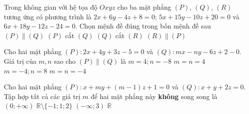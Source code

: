 \begin{ex}
	Trong không gian với hệ tọa độ $O x y z$ cho ba mặt phẳng $(P)$, $(Q)$, $(R)$ tương ứng có phương trình là $2 x+6 y-4 z+8=0$; $5 x+15 y-10 z+20=0$ và $6 x+18 y-12 z-24=0$. Chọn mệnh đề đúng trong bốn mệnh đề sau
	\choice
	{$(P) \parallel (Q)$}
	{$(P)$ cắt $(Q)$}
	{$(Q)$ cắt $(R)$}
	{\True $(R) \parallel (P)$}
\end{ex}
\begin{ex}%
	Cho hai mặt phẳng $(P) \colon 2x+4y+3z-5=0$ và $(Q) \colon mx-ny-6z+2-0$. Giá trị của $m,n$ sao cho $(P) \parallel (Q)$ là
	\choice
	{$m=4;n=-8$}
	{$m=n=4$}
	{\True $m=-4;n=8$}
	{$m=n=-4$}
	
\end{ex}

\begin{ex}
	Cho hai mặt phẳng $(P)\colon x+my+(m-1)z+1=0$ và $(Q)\colon x+y+2z=0$. Tập hợp tất cả các giá trị $m$ để hai mặt phẳng này \textbf{không} song song là
	\choice
	{$(0;+\infty)$}
	{$\mathbb{R}\setminus\{-1;1;2\}$}
	{$(-\infty;3)$}
	{\True $\mathbb{R}$}
\end{ex}

